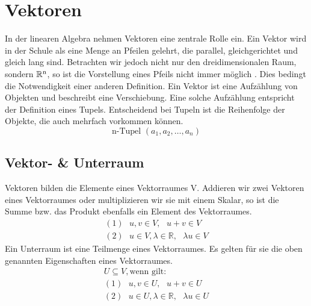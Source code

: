 


%

\section{Vektoren}
In der linearen Algebra nehmen Vektoren eine zentrale Rolle ein. Ein Vektor wird in der Schule als eine Menge an Pfeilen gelehrt, die parallel, gleichgerichtet und gleich lang sind. Betrachten wir jedoch nicht nur den dreidimensionalen Raum, sondern $\mathbb{R}\textsuperscript{n}$, so ist die Vorstellung eines Pfeils nicht immer m\"oglich . Dies bedingt die Notwendigkeit einer anderen Definition.
\newline
\indent Ein Vektor ist eine Aufz\"ahlung von Objekten und beschreibt eine Verschiebung. Eine solche Aufz\"ahlung entspricht der Definition eines Tupels. Entscheidend bei Tupeln ist die Reihenfolge der Objekte, die auch mehrfach vorkommen k\"onnen.
\begin{equation*}
\text{n-Tupel } (a_1,a_2,\dots,a_n)
\end{equation*}
\subsection{Vektor- \& Unterraum}
Vektoren bilden die Elemente eines Vektorraumes V. Addieren wir zwei Vektoren eines Vektorraumes oder multiplizieren wir sie mit einem Skalar, so ist die Summe bzw. das Produkt ebenfalls ein Element des Vektorraumes.
\begin{align*}
(1)\text{ }u, v \in V,\text{ } u+v \in V  \\
(2)\text{ }u \in V, \lambda \in \mathbb{R} ,\text{ }\lambda u \in V
\end{align*}
Ein Unterraum ist eine Teilmenge eines Vektorraumes. Es gelten f\"ur sie die oben genannten Eigenschaften eines Vektorraumes.
\begin{align*}
U\subseteq V, \text{wenn gilt:}	\\
(1)\text{ }u, v \in U,\text{ } u+v \in U  \\
(2)\text{ }u \in U, \lambda \in \mathbb{R} ,\text{ }\lambda u \in U
\end{align*}
